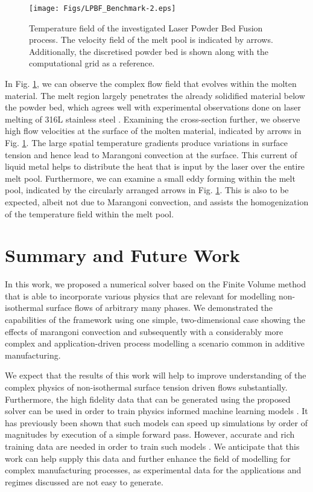 \documentclass[conference,final,a4paper]{IEEEtran}
\begin{document}
\begin{figure}[!t]
  \centering
  \texttt{[image: Figs/LPBF\_Benchmark-2.eps]}
  \caption{Temperature field of the investigated Laser Powder Bed Fusion process. The velocity field of the melt pool is indicated by arrows. Additionally, the discretised powder bed is shown along with the computational grid as a reference.}
  \label{fig:lpbf-benchmark}
\end{figure}

In Fig. \ref{fig:lpbf-benchmark}, we can observe the complex flow field that evolves within the molten material. The melt region largely penetrates the already solidified material below the powder bed, which agrees well with experimental observations done on laser melting of 316L stainless steel \cite{mohrInSituDefectDetection2020}.
Examining the cross-section further, we observe high flow velocities at the surface of the molten material, indicated by arrows in Fig. \ref{fig:lpbf-benchmark}. The large spatial temperature gradients produce variations in surface tension and hence lead to Marangoni convection at the surface. This current of liquid metal helps to distribute the heat that is input by the laser over the entire melt pool.
Furthermore, we can examine a small eddy forming within the melt pool, indicated by the circularly arranged arrows in Fig. \ref{fig:lpbf-benchmark}. This is also to be expected, albeit not due to Marangoni convection, and assists the homogenization of the temperature field within the melt pool.

\section{Summary and Future Work}

In this work, we proposed a numerical solver based on the Finite Volume method that is able to incorporate various physics that are relevant for modelling non-isothermal surface flows of arbitrary many phases. We demonstrated the capabilities of the framework using one simple, two-dimensional case showing the effects of marangoni convection and subsequently with a considerably more complex and application-driven process modelling a scenario common in additive manufacturing.

We expect that the results of this work will help to improve understanding of the complex physics of non-isothermal surface tension driven flows substantially. Furthermore, the high fidelity data that can be generated using the proposed solver can be used in order to train physics informed machine learning models \cite{karniadakisPhysicsinformedMachineLearning2021}. It has previously been shown that such models can speed up simulations by order of magnitudes by execution of a simple forward pass. However, accurate and rich training data are needed in order to train such models \cite{liFourierNeuralOperator2021,luDeepONetLearningNonlinear2020}. We anticipate that this work can help supply this data and further enhance the field of modelling for complex manufacturing processes, as experimental data for the applications and regimes discussed are not easy to generate.
\end{document}
